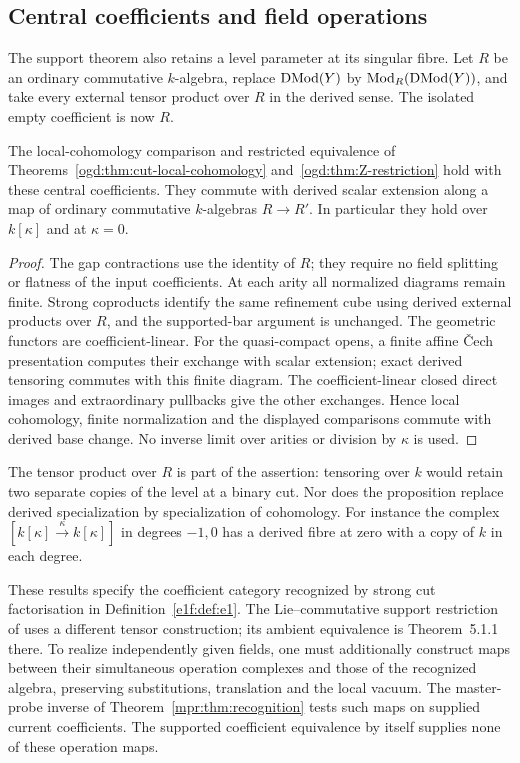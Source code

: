 \subsection{Central coefficients and field operations}

The support theorem also retains a level parameter at its singular fibre.
Let\label{ogd:def:central-coefficient-ring} $R$ be an ordinary commutative $k$-algebra, replace
$\operatorname{DMod}(Y)$ by $\operatorname{Mod}_R(\operatorname{DMod}(Y))$, and take every
external tensor product over $R$ in the derived sense.
The isolated empty coefficient is now $R$.

\begin{proposition}\label{ogd:prop:relative-Z}
The local-cohomology comparison and restricted equivalence of
Theorems~\ref{ogd:thm:cut-local-cohomology} and~\ref{ogd:thm:Z-restriction}
hold with these central coefficients. They commute with derived scalar
extension along a map of ordinary commutative $k$-algebras $R\to R'$.
In particular they hold over $k[\kappa]$ and at $\kappa=0$.
\end{proposition}

\begin{proof}
The gap contractions use the identity of $R$; they require no field
splitting or flatness of the input coefficients.
At each arity all normalized diagrams remain finite.
Strong coproducts identify the same refinement cube using derived
external products over $R$, and the supported-bar argument is unchanged.
The geometric functors are coefficient-linear. For the quasi-compact
opens, a finite affine \v Cech presentation computes their exchange with
scalar extension; exact derived tensoring commutes with this finite
diagram. The coefficient-linear closed direct images and extraordinary
pullbacks give the other exchanges. Hence local cohomology, finite
normalization and the displayed comparisons commute with derived base
change. No inverse limit over arities or division by $\kappa$ is used.
\end{proof}

The tensor product over $R$ is part of the assertion: tensoring over $k$
would retain two separate copies of the level at a binary cut.
Nor does the proposition replace derived specialization by specialization
of cohomology. For instance the complex
$[k[\kappa]\xrightarrow{\kappa}k[\kappa]]$ in degrees $-1,0$
has a derived fibre at zero with a copy of $k$ in each degree.

These results specify the coefficient category recognized by strong cut
factorisation in Definition~\ref{e1f:def:e1}.
The Lie--commutative support restriction of
 uses a different tensor construction;
its ambient equivalence is Theorem~5.1.1 there.
To realize independently given fields, one must additionally construct
maps between their simultaneous operation complexes and those of the
recognized algebra, preserving substitutions, translation and the local
vacuum. The master-probe inverse of Theorem~\ref{mpr:thm:recognition}
tests such maps on supplied current coefficients. The supported coefficient
equivalence by itself supplies none of these operation maps.

